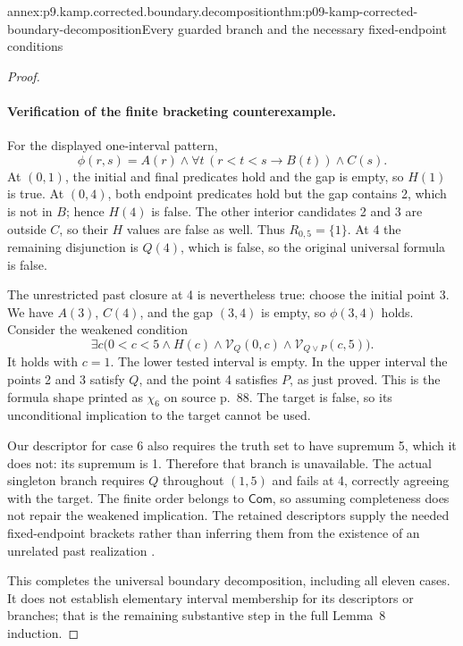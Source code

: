 \begin{annexitem}{annex:p9.kamp.corrected.boundary.decomposition}{thm:p09-kamp-corrected-boundary-decomposition}{Every guarded branch and the necessary fixed-endpoint conditions}
\begin{proof}
\paragraph{Verification of the finite bracketing counterexample.}
For the displayed one-interval pattern,
\[
 \phi(r,s)=A(r)\land\forall t\,(r<t<s\to B(t))\land C(s).
\]
At \((0,1)\), the initial and final predicates hold and the
gap is empty, so \(H(1)\) is true.
At \((0,4)\), both endpoint predicates hold but the gap
contains 2, which is not in \(B\); hence \(H(4)\) is false.
The other interior candidates 2 and 3 are outside \(C\),
so their \(H\) values are false as well. Thus
\(R_{0,5}=\{1\}\).
At 4 the remaining disjunction is \(Q(4)\), which is false,
so the original universal formula is false.

The unrestricted past closure at 4 is nevertheless true: choose
the initial point 3. We have \(A(3)\), \(C(4)\), and
the gap \((3,4)\) is empty, so \(\phi(3,4)\) holds.
Consider the weakened condition
\[
 \exists c\bigl(0<c<5\land H(c)\land
        \mathcal V_Q(0,c)\land\mathcal V_{Q\lor P}(c,5)\bigr).
 \tag{2}
\]
It holds with \(c=1\). The lower tested interval is empty.
In the upper interval the points 2 and 3 satisfy \(Q\),
and the point 4 satisfies \(P\), as just proved. This is
the formula shape printed as \(\chi_6\) on source p.~88.
The target is false, so its unconditional implication to the
target cannot be used.

Our descriptor for case 6 also requires the truth set to have
supremum 5, which it does not: its supremum is 1. Therefore
that branch is unavailable. The actual singleton branch requires
\(Q\) throughout \((1,5)\) and fails at 4, correctly
agreeing with the target. The finite order belongs to
\(\mathsf{Com}\), so assuming completeness does not repair
the weakened implication. The retained descriptors supply the
needed fixed-endpoint brackets rather than inferring them from
the existence of an unrelated past realization
\cite[ch.~III, pp.~85--89]{Kamp1968}.

This completes the universal boundary decomposition, including all
eleven cases. It does not establish elementary interval membership
for its descriptors or branches; that is the remaining substantive
step in the full Lemma~8 induction.
\end{proof}
\end{annexitem}
